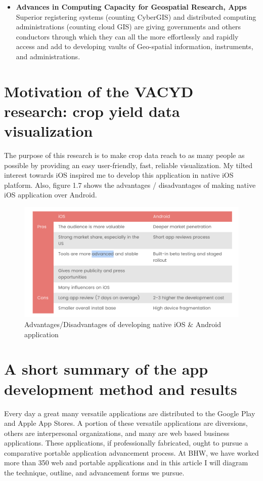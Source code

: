 \begin{itemize}
  \item  \textbf{Advances in Computing Capacity for Geospatial Research, Apps} \\
 Superior registering systems (counting CyberGIS) and distributed computing administrations (counting cloud GIS) are giving governments and others conductors through which they can all the more effortlessly and rapidly access and add to developing vaults of Geo-spatial information, instruments, and administrations.
  
\end{itemize}

\section{Motivation of the VACYD research: crop yield data visualization}

The purpose of this research is to make crop data reach to as many people as possible by providing an easy user-friendly, fast, reliable visualization. My tilted interest towards \gls{iOS} inspired me to develop this application in native \gls{iOS} platform. Also, figure 1.7 shows the advantages / disadvantages of making native \gls{iOS} application over Android.

  \begin{figure}[H]
            \centering
            \includegraphics[width=0.8\linewidth]{figures/ch1/iosVSandroid.png}
            \caption{\label{fig:iosVSandroid} Advantages/Disadvantages of developing native iOS \& Android application \cite{theAPPsolutions}}
  \end{figure}


\section{A short summary of the app development method and results}

Every day a great many versatile applications are distributed to the Google Play and Apple App Stores. A portion of these versatile applications are diversions, others are interpersonal organizations, and many are web based business applications. These applications, if professionally fabricated, ought to pursue a comparative portable application advancement process. At BHW, we have worked more than 350 web and portable applications and in this article I will diagram the technique, outline, and advancement forms we pursue. 

